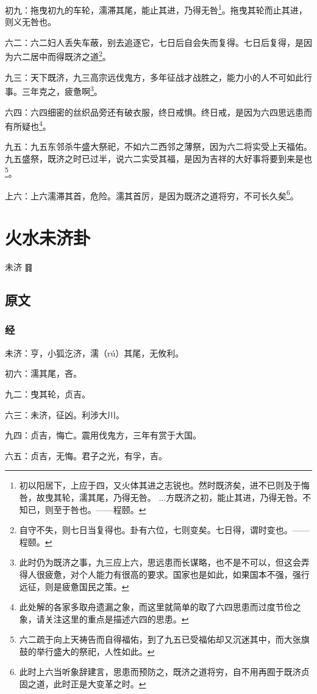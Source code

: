 \documentclass[12pt,oneside]{book}
\begin{document}
初九：拖曳初九的车轮，濡滞其尾，能止其进，乃得无咎\footnote{初以阳居下，上应于四，又火体其进之志锐也。然时既济矣，进不已则及于悔咎，故曳其轮，濡其尾，乃得无咎。 ...方既济之初，能止其进，乃得无咎。不知已，则至于咎也。——程颐。}。拖曳其轮而止其进，则义无咎也。

六二：六二妇人丢失车蔽，别去追逐它，七日后自会失而复得。七日后复得，是因为六二居中而得既济之道\footnote{自守不失，则七日当复得也。卦有六位，七则变矣。七日得，谓时变也。——程颐。}。

九三：天下既济，九三高宗远伐鬼方，多年征战才战胜之，能力小的人不可如此行事。三年克之，疲惫啊\footnote{此时仍为既济之事，九三应上六，思远患而长谋略，也不是不可以，但这会弄得人很疲惫，对个人能力有很高的要求。国家也是如此，如果国本不强，强行远征，则是疲惫国民之策。}。

六四：六四细密的丝织品旁还有破衣服，终日戒惧。终日戒，是因为六四思远患而有所疑也\footnote{此处解的各家多取舟遗漏之象，而这里就简单的取了六四思患而过度节俭之象，请关注这里的重点是描述六四的思患。}。

九五：九五东邻杀牛盛大祭祀，不如六二西邻之薄祭，因为六二将实受上天福佑。九五盛祭，既济之时已过半，说六二实受其福，是因为吉祥的大好事将要到来是也\footnote{六二疏于向上天祷告而自得福佑，到了九五已受福佑却又沉迷其中，而大张旗鼓的举行盛大的祭祀，人性如此。}。

上六：上六濡滞其首，危险。濡其首厉，是因为既济之道将穷，不可长久矣\footnote{此时上六当听象辞建言，思患而预防之，既济之道将穷，自不用再囿于既济贞固之道，此时正是大变革之时。}。



\chapter{火水未济卦}
未济 {\Large ䷿}
\section{原文}

\subsection{经}
未济：亨，小狐汔济，濡（rú）其尾，无攸利。

初六：濡其尾，吝。

九二：曳其轮，贞吉。

六三：未济，征凶。利涉大川。

九四：贞吉，悔亡。震用伐鬼方，三年有赏于大国。

六五：贞吉，无悔。君子之光，有孚，吉。
\end{document}
